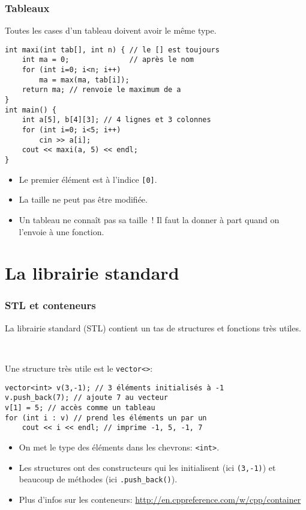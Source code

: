 \documentclass[12pt]{beamer}
\begin{document}
\begin{frame}[fragile]
\frametitle{Tableaux}
Toutes les cases d'un tableau doivent avoir le même type.
\begin{lstlisting}
int maxi(int tab[], int n) { // le [] est toujours
    int ma = 0;              // après le nom
    for (int i=0; i<n; i++)
        ma = max(ma, tab[i]);
    return ma; // renvoie le maximum de a
}
int main() {
    int a[5], b[4][3]; // 4 lignes et 3 colonnes
    for (int i=0; i<5; i++)
        cin >> a[i];
    cout << maxi(a, 5) << endl;
}
\end{lstlisting}
\begin{itemize}
\item Le premier élément est à l'indice \lstinline|[0]|.
\item La taille ne peut pas être modifiée.
\item Un tableau ne connaît pas sa taille ! Il faut la donner à part quand on l'envoie à une fonction.
\end{itemize}
\end{frame}


\section{La librairie standard}

\begin{frame}[fragile]
\frametitle{STL et conteneurs}
La librairie standard (STL) contient un tas de structures et fonctions très utiles.

~

Une structure très utile est le \lstinline|vector<>|:
\begin{lstlisting}
vector<int> v(3,-1); // 3 éléments initialisés à -1
v.push_back(7); // ajoute 7 au vecteur
v[1] = 5; // accès comme un tableau
for (int i : v) // prend les éléments un par un
    cout << i << endl; // imprime -1, 5, -1, 7
\end{lstlisting}
\begin{itemize}
\item On met le type des éléments dans les chevrons: \lstinline|<int>|.
\item Les structures ont des constructeurs qui les initialisent (ici \lstinline|(3,-1)|) et beaucoup de méthodes (ici \lstinline|.push_back()|).
\item Plus d'infos sur les conteneurs: \url{http://en.cppreference.com/w/cpp/container}
\end{itemize}
\end{frame}
\end{document}
